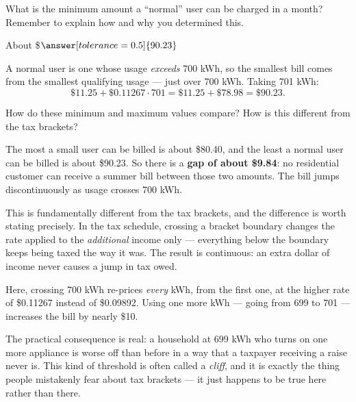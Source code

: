 \documentclass[12pt]{ximera}
\begin{document}
\begin{problem}
What is the minimum amount a ``normal'' user can be charged in a month? Remember to
explain how and why you determined this.

About \$$\answer[tolerance=0.5]{90.23}$

\begin{freeResponse}
\end{freeResponse}

\begin{solution}
A normal user is one whose usage \emph{exceeds} 700 kWh, so the smallest bill comes from
the smallest qualifying usage --- just over 700 kWh. Taking 701 kWh:
\[
\$11.25 + \$0.11267 \cdot 701 = \$11.25 + \$78.98 = \$90.23.
\]
\end{solution}
\end{problem}

\begin{problem}
How do these minimum and maximum values compare? How is this different from the tax
brackets?

\begin{freeResponse}
\end{freeResponse}

\begin{solution}
The most a small user can be billed is about \$80.40, and the least a normal user can be
billed is about \$90.23. So there is a \textbf{gap of about \$9.84}: no residential
customer can receive a summer bill between those two amounts. The bill jumps
discontinuously as usage crosses 700 kWh.

This is fundamentally different from the tax brackets, and the difference is worth
stating precisely. In the tax schedule, crossing a bracket boundary changes the rate
applied to the \emph{additional} income only --- everything below the boundary keeps
being taxed the way it was. The result is continuous: an extra dollar of income never
causes a jump in tax owed.

Here, crossing 700 kWh re-prices \emph{every} kWh, from the first one, at the higher
rate of \$0.11267 instead of \$0.09892. Using one more kWh --- going from 699 to 701 ---
increases the bill by nearly \$10.

The practical consequence is real: a household at 699 kWh who turns on one more
appliance is worse off than before in a way that a taxpayer receiving a raise never is.
This kind of threshold is often called a \emph{cliff}, and it is exactly the thing people
mistakenly fear about tax brackets --- it just happens to be true here rather than there.
\end{solution}
\end{problem}
\end{document}
